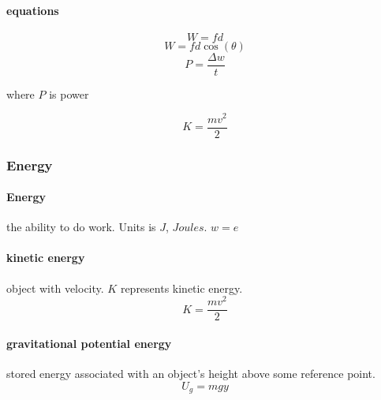 \documentclass{article} %
\begin{document}
            \paragraph{equations}
                $$W=fd$$
                $$W=fd\cos(\theta)$$
                $$P=\dfrac{\Delta w}{t}$$
                \begin{center} where $P$ is power \end{center}
                $$K=\frac{mv^2}{2}$$
        \subsubsection{Energy}
            \paragraph{Energy}
                the ability to do work. Units is $J$, $Joules$. $w=e$
            \paragraph{kinetic energy}
                object with velocity. $K$ represents kinetic energy.
                $$K=\frac{mv^2}{2}$$ 
            \paragraph{gravitational potential energy}%
            \label{par:gravitational potential energy}
                stored energy associated with an object's height above some reference point.
                $$U_g=mgy$$
                
\end{document}
